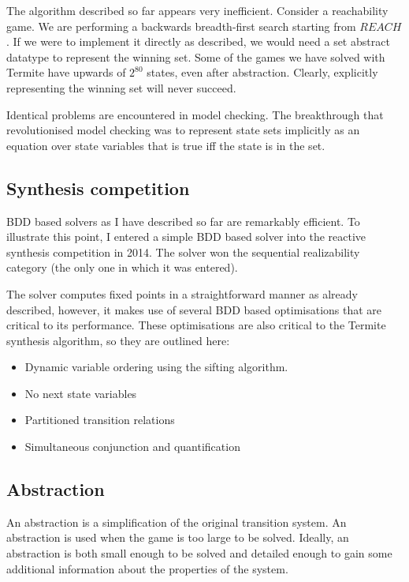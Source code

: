 \documentclass{article}
\begin{document}
The algorithm described so far appears very inefficient. Consider a reachability game. We are performing a backwards breadth-first search starting from $REACH$. If we were to implement it directly as described, we would need a set abstract datatype to represent the winning set. Some of the games we have solved with Termite have upwards of $2^{80}$ states, even after abstraction. Clearly, explicitly representing the winning set will never succeed. 

Identical problems are encountered in model checking. The breakthrough that revolutionised model checking was to represent state sets implicitly as an equation over state variables that is true iff the state is in the set. 

\subsection{Synthesis competition}

BDD based solvers as I have described so far are remarkably efficient. To illustrate this point, I entered a simple BDD based solver into the reactive synthesis competition in 2014. The solver won the sequential realizability category (the only one in which it was entered). 

The solver computes fixed points in a straightforward manner as already described, however, it makes use of several BDD based optimisations that are critical to its performance. These optimisations are also critical to the Termite synthesis algorithm, so they are outlined here:

\begin{itemize}
    \item Dynamic variable ordering using the sifting algorithm.
    \item No next state variables
    \item Partitioned transition relations
    \item Simultaneous conjunction and quantification
\end{itemize}

\subsection{Abstraction}
An abstraction is a simplification of the original transition system. An abstraction is used when the game is too large to be solved. Ideally, an abstraction is both small enough to be solved and detailed enough to gain some additional information about the properties of the system. 
\end{document}

